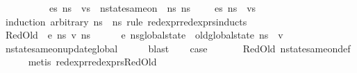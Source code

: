 \begin{isabellebody}
\ \ \ \ \ \ \ \ {\isachardoublequoteopen}{\isasymLambda}{\isacharcomma}{\kern0pt}{\isasymGamma}{\isacharcomma}{\kern0pt}{\isasymOmega}\ {\isasymturnstile}\ {\isasymlangle}es{\isacharcomma}{\kern0pt}\ ns{}{\isasymrangle}\ {\isacharbrackleft}{\kern0pt}{\isasymDown}{\isacharbrackright}{\kern0pt}\ vs\ {\isasymLongrightarrow}\ nstate{\isacharunderscore}{\kern0pt}same{\isacharunderscore}{\kern0pt}on\ {\isasymLambda}\ ns{}\ ns{}\ {\isacharbraceleft}{\kern0pt}{\isacharbraceright}{\kern0pt}\ {\isasymLongrightarrow}\ {\isasymLambda}{\isacharcomma}{\kern0pt}{\isasymGamma}{\isacharcomma}{\kern0pt}{\isasymOmega}\ {\isasymturnstile}\ {\isasymlangle}es{\isacharcomma}{\kern0pt}\ ns{}{\isasymrangle}\ {\isacharbrackleft}{\kern0pt}{\isasymDown}{\isacharbrackright}{\kern0pt}\ vs{\isachardoublequoteclose}\isanewline
%
\isadelimproof
%
\endisadelimproof
%
\isatagproof
{}\isamarkupfalse%
\ {\isacharparenleft}{\kern0pt}induction\ arbitrary{\isacharcolon}{\kern0pt}\ ns{}\ \ ns{}\ rule{\isacharcolon}{\kern0pt}\ red{\isacharunderscore}{\kern0pt}expr{\isacharunderscore}{\kern0pt}red{\isacharunderscore}{\kern0pt}exprs{\isachardot}{\kern0pt}inducts{\isacharparenright}{\kern0pt}\isanewline
\ \ \isamarkupfalse%
\ {\isacharparenleft}{\kern0pt}RedOld\ {\isasymOmega}\ e\ ns{}\ v\ ns{}{\isacharparenright}{\kern0pt}\isanewline
\ \ \isamarkupfalse%
\ {\isachardoublequoteopen}{\isasymLambda}{\isacharcomma}{\kern0pt}{\isasymGamma}{\isacharcomma}{\kern0pt}{\isasymOmega}\ {\isasymturnstile}\ {\isasymlangle}e{\isacharcomma}{\kern0pt}\ ns{}{\isasymlparr}global{\isacharunderscore}{\kern0pt}state\ {\isacharcolon}{\kern0pt}{\isacharequal}{\kern0pt}\ old{\isacharunderscore}{\kern0pt}global{\isacharunderscore}{\kern0pt}state\ ns{}{\isasymrparr}{\isasymrangle}\ {\isasymDown}\ v{\isachardoublequoteclose}\ \isamarkupfalse%
\ nstate{\isacharunderscore}{\kern0pt}same{\isacharunderscore}{\kern0pt}on{\isacharunderscore}{\kern0pt}update{\isacharunderscore}{\kern0pt}global\isanewline
\ \ \ \ \isamarkupfalse%
\ blast\isanewline
\ \ \isamarkupfalse%
\ {\isacharquery}{\kern0pt}case\ \isanewline
\ \ \ \ \isamarkupfalse%
\ RedOld\ nstate{\isacharunderscore}{\kern0pt}same{\isacharunderscore}{\kern0pt}on{\isacharunderscore}{\kern0pt}def\isanewline
\ \ \ \ \isamarkupfalse%
\ {\isacharparenleft}{\kern0pt}metis\ red{\isacharunderscore}{\kern0pt}expr{\isacharunderscore}{\kern0pt}red{\isacharunderscore}{\kern0pt}exprs{\isachardot}{\kern0pt}RedOld{\isacharparenright}{\kern0pt}\isanewline

\end{isabellebody}

